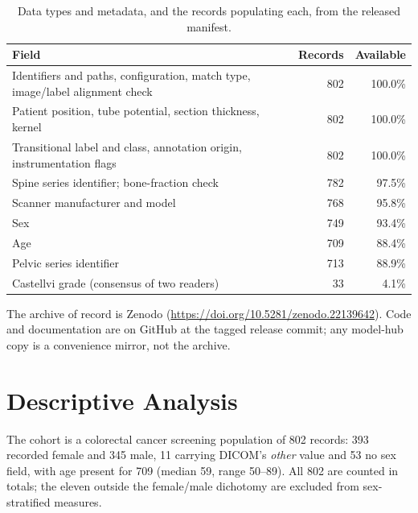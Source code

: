 \documentclass[aapm,mph,amsmath,amssymb,reprint]{revtex4-2}
\newcommand{\datasetdoi}{10.5281/zenodo.22139642}
\newcommand{\doiurl}[1]{\url{https://doi.org/#1}}
\begin{document}
\begin{table}[t]
\caption{\label{tab:completeness}Data types and metadata, and the records populating
each, from the released manifest.}
\begin{ruledtabular}
\begin{tabular}{lrr}
Field & Records & Available \\
\hline
Identifiers and paths, configuration, match type, image/label alignment check & 802 & 100.0\% \\
Patient position, tube potential, section thickness, kernel & 802 & 100.0\% \\
Transitional label and class, annotation origin, instrumentation flags & 802 & 100.0\% \\
Spine series identifier; bone-fraction check & 782 & 97.5\% \\
Scanner manufacturer and model & 768 & 95.8\% \\
Sex & 749 & 93.4\% \\
Age & 709 & 88.4\% \\
Pelvic series identifier & 713 & 88.9\% \\
Castellvi grade (consensus of two readers) & 33 & 4.1\% \\
\end{tabular}
\end{ruledtabular}
\end{table}



The archive of record is Zenodo (\doiurl{\datasetdoi}). Code and documentation are on GitHub at
the tagged release commit; any model-hub copy is a convenience mirror, not the archive.

\section{Descriptive Analysis}
\label{sec:descriptive}


The cohort is a colorectal cancer screening population of 802 records: 393 recorded female
and 345 male, 11 carrying DICOM's \emph{other} value and 53 no sex field, with age present
for 709 (median 59, range 50--89). All 802 are counted in totals; the eleven outside the
female/male dichotomy are excluded from sex-stratified measures.
\end{document}
